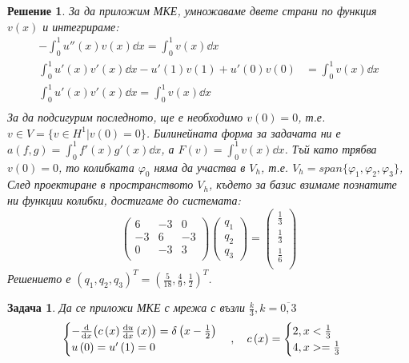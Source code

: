 \documentclass[12pt]{article}
\newtheorem{problem}{Задача}
\newtheorem*{solution*}{Решение}
\begin{document}
\begin{large}
\begin{solution*}
    За да приложим МКЕ, умножаваме двете страни по функция $v(x)$ и интегрираме:
    \begin{align*}
      -\int_{0}^{1}u''(x)v(x)\dd x = \int_{0}^{1}v(x)\dd x \\
      \int_{0}^{1}u'(x)v'(x)\dd x - u'\left(1\right)v\left(1\right)+ u'\left(0\right)v\left(0\right) &= \int_{0}^{1}v(x)\dd x \\
      \int_{0}^{1}u'(x)v'(x)\dd x = \int_{0}^{1}v(x)\dd x \\
    \end{align*}
    За да подсигурим последното, ще е необходимо $v\left(0\right)=0$, т.е. $v \in V = \{v \in H^1 \vert v\left(0\right)=0\}$. Билинейната форма за задачата ни е $a\left(f, g\right)=\int_{0}^{1}f'(x)g'(x)\dd x$, а $F\left(v\right)=\int_{0}^{1}v(x)\dd x$. Тъй като трябва $v(0)=0$, то колибката $\varphi_0$ няма да участва в $V_h$, т.е. $V_h = span\{\varphi_1, \varphi_2, \varphi_3\}$,  След проектиране в пространството $V_h$, където за базис взимаме познатите ни функции колибки,  достигаме до системата:
    \begin{equation}
      \begin{pmatrix}
        6 & -3 & 0 \\
        -3 & 6 & -3 \\
        0 & -3 & 3 \\
      \end{pmatrix}
      \begin{pmatrix}
        q_1 \\
        q_2 \\
        q_3
      \end{pmatrix}
      =
      \begin{pmatrix}
        \frac{1}{3} \\
        \frac{1}{3} \\
        \frac{1}{6} \\
      \end{pmatrix}
    \end{equation}
    Решението е $(q_1, q_2, q_3)^T = (\frac{5}{18}, \frac{4}{9}, \frac{1}{2})^T$.
    \end{solution*}

  \begin{problem}
    Да се приложи МКЕ с мрежа с възли $\frac{k}{3}, k=\overline{0,3}$
    \begin{equation}
      \begin{cases}
        -\dv{x}(c\left(x\right)\dv{u}{x}\left(x\right)) = \delta\left(x-\frac{1}{2}\right) \\
        u\left(0\right)=u'\left(1\right)=0
      \end{cases} , \quad
      c\left(x\right)
      =
      \begin{cases}
        2, x<\frac{1}{3} \\
        4, x>=\frac{1}{3} \\
      \end{cases} \\
    \end{equation}
  \end{problem}


\end{large}
\end{document}
